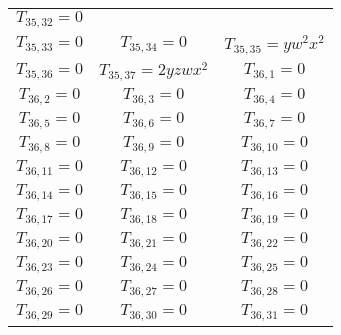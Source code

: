 \documentclass[12pt]{memoireuqam1.3}
\begin{document}
\begin{longtable}{|c|c|c|}
$T_{35,32}= 0$\\

$T_{35,33}= 0$&

$T_{35,34}= 0$&

$T_{35,35}= yw^2x^2$\\

$T_{35,36}= 0$&

$T_{35,37}= 2yzwx^2$&

$T_{36,1}= 0$\\

$T_{36,2}= 0$&

$T_{36,3}= 0$&

$T_{36,4}= 0$\\

$T_{36,5}= 0$&

$T_{36,6}= 0$&

$T_{36,7}= 0$\\

$T_{36,8}= 0$&

$T_{36,9}= 0$&

$T_{36,10}= 0$\\

$T_{36,11}= 0$&

$T_{36,12}= 0$&

$T_{36,13}= 0$\\

$T_{36,14}= 0$&

$T_{36,15}= 0$&

$T_{36,16}= 0$\\

$T_{36,17}= 0$&

$T_{36,18}= 0$&

$T_{36,19}= 0$\\

$T_{36,20}= 0$&

$T_{36,21}= 0$&

$T_{36,22}= 0$\\

$T_{36,23}= 0$&

$T_{36,24}= 0$&

$T_{36,25}= 0$\\

$T_{36,26}= 0$&

$T_{36,27}= 0$&

$T_{36,28}= 0$\\

$T_{36,29}= 0$&

$T_{36,30}= 0$&

$T_{36,31}= 0$\\


\end{longtable}
\end{document}
